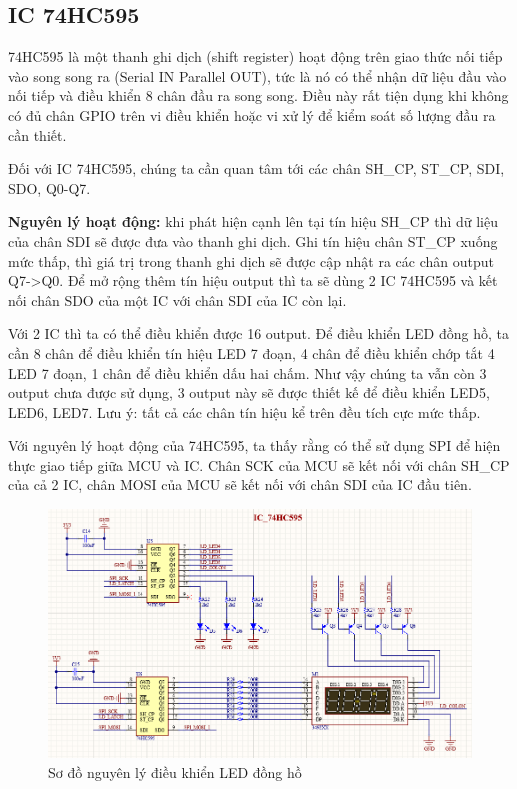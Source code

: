 \subsection{IC 74HC595}
74HC595 là một thanh ghi dịch (shift register) hoạt động trên giao thức nối tiếp vào song song ra (Serial IN Parallel OUT), tức là nó có thể nhận dữ liệu đầu vào nối tiếp và điều khiển 8 chân đầu ra song song. Điều này rất tiện dụng khi không có đủ chân GPIO trên vi điều khiển hoặc vi xử lý để kiểm soát số lượng đầu ra cần thiết.

Đối với IC 74HC595, chúng ta cần quan tâm tới các chân SH\_CP, ST\_CP, SDI, SDO, Q0-Q7.

\textbf{Nguyên lý hoạt động:} khi phát hiện cạnh lên tại tín hiệu SH\_CP thì dữ liệu của chân SDI sẽ được đưa vào thanh ghi dịch. Ghi tín hiệu chân ST\_CP xuống mức thấp, thì giá trị trong thanh ghi dịch sẽ được cập nhật ra các chân output Q7->Q0. Để mở rộng thêm tín hiệu output thì ta sẽ dùng 2 IC 74HC595 và kết nối chân SDO của một IC với chân SDI của IC còn lại.

Với 2 IC thì ta có thể điều khiển được 16 output. Để điều khiển LED đồng hồ, ta cần 8 chân để điều khiển tín hiệu LED 7 đoạn, 4 chân để điều khiển chớp tắt 4 LED 7 đoạn, 1 chân để điều khiển dấu hai chấm. Như vậy chúng ta vẫn còn 3 output chưa được sử dụng, 3 output này sẽ được thiết kế để điều khiển LED5, LED6, LED7. Lưu ý: tất cả các chân tín hiệu kể trên đều tích cực mức thấp.

Với nguyên lý hoạt động của 74HC595, ta thấy rằng có thể sử dụng SPI để hiện thực giao tiếp giữa MCU và IC. Chân SCK của MCU sẽ kết nối với chân SH\_CP của cả 2 IC, chân MOSI của MCU sẽ kết nối với chân SDI của IC đầu tiên.

\begin{figure}[h]
    \centering
    \includegraphics[width=\textwidth]{graphics/sche.PNG}
    \caption{Sơ đồ nguyên lý điều khiển LED đồng hồ}
\end{figure}